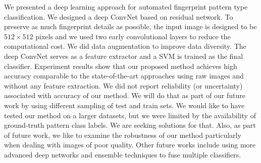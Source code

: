 
We presented a deep learning approach for automated fingerprint pattern type classification. We designed a deep ConvNet based on residual network. To preserve as much fingerprint details as possible, the input image  is designed to be  $512\times512$ pixels and we used two early convolutional layers to reduce the computational cost.  We did data augmentation to improve data diversity.  The deep ConvNet serves as a feature extractor and a SVM is trained as the final classifier. Experiment results show that our proposed method achieves high accuracy comparable to the state-of-the-art approaches using raw images and without any feature extraction.  We did not report reliability (or uncertainty) associated with accuracy of our method.  We will do that as part of our future work by using different sampling of test and train sets.  We would  like to have tested our method on a larger datasets, but we were limited by the availability of ground-truth pattern class labels.  We are seeking solutions for that.  Also, as part of future work, we like to examine the robustness of our method particularly when dealing with images of poor quality.
Other future works include using more advanced deep networks and ensemble techniques to fuse multiple classifiers.